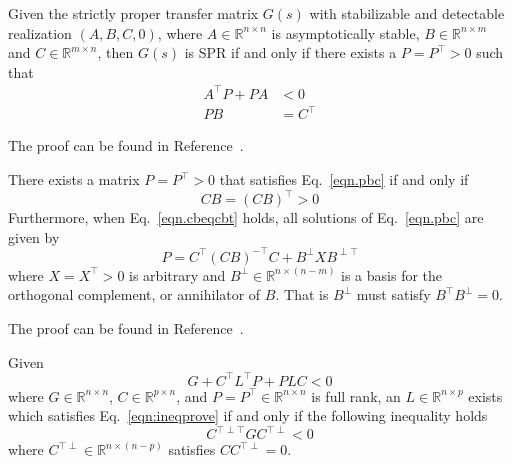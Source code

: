\documentclass[]{../sty/JGCD}
\theoremstyle{examplestyle}
\begin{document}
  \begin{lem-dan}\label{lem.KY}
    Given the strictly proper transfer matrix $G(s)$ with stabilizable and detectable realization $(A,B,C,0)$, where $A\in\mathbb{R}^{n\times n}$ is asymptotically stable, $B\in\mathbb{R}^{n\times m}$ and $C\in\mathbb{R}^{m\times n}$, then $G(s)$ is SPR if and only if there exists a $P=P^{\top}>0$ such that
    \begin{align}
      \label{eqn.lyapal2}
      A^{\top}P+PA&<0 \\
      \label{eqn.pbc}
      PB&=C^{\top}
    \end{align}
  \end{lem-dan}

  \begin{proof-dan}
    The proof can be found in Reference\ \cite{narendra.frequency.1973}.
  \end{proof-dan}

  \begin{cor-dan}
    There exists a matrix $P=P^{\top}>0$ that satisfies Eq.\ \eqref{eqn.pbc} if and only if
    \begin{equation}
      \label{eqn.cbeqcbt}
      CB=(CB)^{\top}>0
    \end{equation}
    Furthermore, when Eq.\ \eqref{eqn.cbeqcbt} holds, all solutions of Eq.\ \eqref{eqn.pbc} are given by
    \begin{equation}
      \label{eqn.P}
      P=C^{\top}(CB)^{-\top}C+B^{\perp}XB^{\perp\top}
    \end{equation}
    where $X=X^{\top}>0$ is arbitrary and $B^{\perp}\in\mathbb{R}^{n\times(n-m)}$ is a basis for the orthogonal complement, or annihilator of $B$.
    That is $B^{\perp}$ must satisfy $B^{\top}B^{\perp}=0$.
  \end{cor-dan}

  \begin{proof-dan}
    The proof can be found in Reference\ \cite{huang.designspr.1999}.
  \end{proof-dan}

  \begin{lem-dan}\label{lem.elimination}
    Given
    \begin{equation}
      \label{eqn:ineqprove}
      G+C^{\top}L^{\top}P+PLC<0
    \end{equation}
    where $G\in\mathbb{R}^{n\times n}$, $C\in\mathbb{R}^{p\times n}$, and $P=P^{\top}\in\mathbb{R}^{n\times n}$ is full rank, an $L\in\mathbb{R}^{n\times p}$ exists which satisfies Eq.\ \eqref{eqn:ineqprove} if and only if the following inequality holds
    \begin{equation*}
      C^{\top\perp\top}GC^{\top\perp}<0
    \end{equation*}
    where $C^{\top\perp}\in\mathbb{R}^{n\times(n-p)}$ satisfies $CC^{\top\perp}=0$.
  \end{lem-dan}
\end{document}
